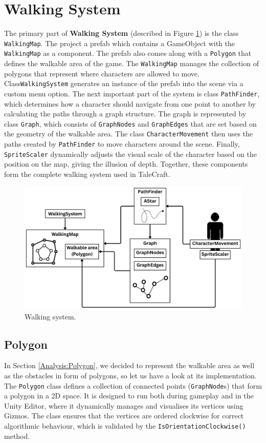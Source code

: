 \section{Walking System}
\label{Walkingystem}
The primary part of \textbf{Walking System} (described in Figure \ref{fig:WalkingSys}) is the class \verb|WalkingMap|. The project a prefab which contains a GameObject with the \verb|WalkingMap| as a component. The prefab also comes along with a \verb|Polygon| that defines the walkable area of the game. The \verb|WalkingMap| manages the collection of polygons that represent where characters are allowed to move. Class\verb|WalkingSystem| generates an instance of the prefab into the scene via a custom menu option.
The next important part of the system is class \verb|PathFinder|, which determines how a character should navigate from one point to another by calculating the paths through a graph structure. The graph is represented by class \verb|Graph|, which consists of \verb|GraphNodes| and \verb|GraphEdges| that are set based on the geometry of the walkable area. The class \verb|CharacterMovement| then uses the paths created by \verb|PathFinder| to move characters around the scene. Finally, \verb|SpriteScaler| dynamically adjusts the visual scale of the character based on the position on the map, giving the illusion of depth. Together, these components form the complete walking system used in TaleCraft.


\begin{figure}[H]
\centering
\includegraphics[width=0.85\linewidth]{img/Walking2.png}
\caption{Walking system.}
\label{fig:WalkingSys}
\end{figure}

 
\subsection{Polygon}
In Section \ref{Analysis:Polygon}, we decided to represent the walkable area as well as the obstacles in form of polygons, so let us have a look at its implementation. The \verb|Polygon| class defines a collection of connected points (\verb|GraphNode|s) that form a polygon in a 2D space. It is designed to run both during gameplay and in the Unity Editor, where it dynamically manages and visualises its vertices using Gizmos. The class ensures that the vertices are ordered clockwise for correct algorithmic behaviour, which is validated by the \verb|IsOrientationClockwise()| method.

